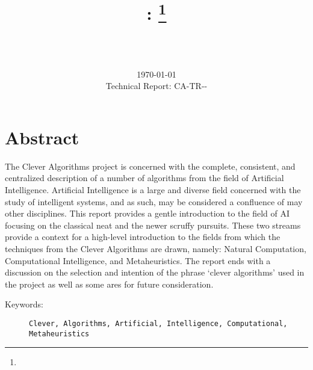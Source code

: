 \documentclass[a4paper, 11pt]{article}
\title{{\myreporttitle}: {\myreportsubtitle}\footnote{\myreportlicense}}
\author{\myreportauthor\\{\myreportemail}\\\small\myreportproject}
\date{\today\\{\small{Technical Report: CA-TR-{\myreportdate}-\myreportversion}}}
\begin{document}
\maketitle

\section*{Abstract} 
The Clever Algorithms project is concerned with the complete, consistent, and centralized description of a number of algorithms from the field of Artificial Intelligence.
Artificial Intelligence is a large and diverse field concerned with the study of intelligent systems, and as such, may be considered a confluence of may other disciplines.
This report provides a gentle introduction to the field of AI focusing on the classical neat and the newer scruffy pursuits. These two streams provide a context for a high-level introduction to the fields from which the techniques from the Clever Algorithms are drawn, namely: Natural Computation, Computational Intelligence, and Metaheuristics.
The report ends with a discussion on the selection and intention of the phrase `clever algorithms' used in the project as well as some ares for future consideration.

\begin{description}
	\item[Keywords:] {\small\texttt{Clever, Algorithms, Artificial, Intelligence, Computational, Metaheuristics}}
\end{description} 

\end{document}
